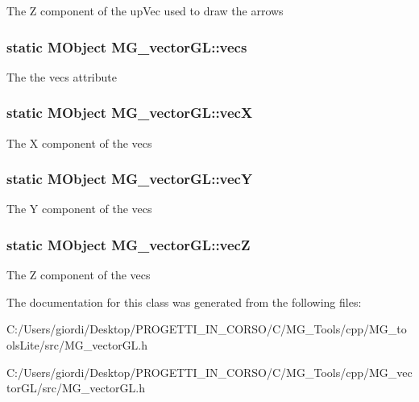 The Z component of the up\-Vec used to draw the arrows \hypertarget{class_m_g__vector_g_l_a7e8fcd12774565e52cfc9a088426fda5}{
\subsubsection[{vecs}]{\setlength{\rightskip}{0pt plus 5cm}static M\-Object M\-G\-\_\-vector\-G\-L\-::vecs\hspace{0.3cm}{\ttfamily [static]}}}\label{class_m_g__vector_g_l_a7e8fcd12774565e52cfc9a088426fda5}
The the vecs attribute \hypertarget{class_m_g__vector_g_l_a6eeaca2cfdf01a1cde7727a7d02e9fb8}{
\subsubsection[{vec\-X}]{\setlength{\rightskip}{0pt plus 5cm}static M\-Object M\-G\-\_\-vector\-G\-L\-::vec\-X\hspace{0.3cm}{\ttfamily [static]}}}\label{class_m_g__vector_g_l_a6eeaca2cfdf01a1cde7727a7d02e9fb8}
The X component of the vecs \hypertarget{class_m_g__vector_g_l_ab83a515ef8a0389db4fffdd27deb0a15}{
\subsubsection[{vec\-Y}]{\setlength{\rightskip}{0pt plus 5cm}static M\-Object M\-G\-\_\-vector\-G\-L\-::vec\-Y\hspace{0.3cm}{\ttfamily [static]}}}\label{class_m_g__vector_g_l_ab83a515ef8a0389db4fffdd27deb0a15}
The Y component of the vecs \hypertarget{class_m_g__vector_g_l_a793496afb749c8d022fb487e7cb7ef50}{
\subsubsection[{vec\-Z}]{\setlength{\rightskip}{0pt plus 5cm}static M\-Object M\-G\-\_\-vector\-G\-L\-::vec\-Z\hspace{0.3cm}{\ttfamily [static]}}}\label{class_m_g__vector_g_l_a793496afb749c8d022fb487e7cb7ef50}
The Z component of the vecs 

The documentation for this class was generated from the following files\-:\begin{DoxyCompactItemize}
\item 
C\-:/\-Users/giordi/\-Desktop/\-P\-R\-O\-G\-E\-T\-T\-I\-\_\-\-I\-N\-\_\-\-C\-O\-R\-S\-O/\-C/\-M\-G\-\_\-\-Tools/cpp/\-M\-G\-\_\-tools\-Lite/src/M\-G\-\_\-vector\-G\-L.\-h\item 
C\-:/\-Users/giordi/\-Desktop/\-P\-R\-O\-G\-E\-T\-T\-I\-\_\-\-I\-N\-\_\-\-C\-O\-R\-S\-O/\-C/\-M\-G\-\_\-\-Tools/cpp/\-M\-G\-\_\-vector\-G\-L/src/M\-G\-\_\-vector\-G\-L.\-h\end{DoxyCompactItemize}
